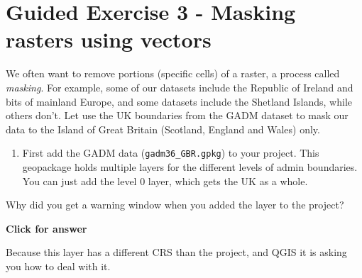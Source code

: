 \documentclass[
  letterpaper,
  DIV=11,
  numbers=noendperiod]{scrreprt}
\providecommand{\tightlist}{%
  \setlength{\itemsep}{0pt}\setlength{\parskip}{0pt}}\usepackage{longtable,booktabs,array}
\begin{document}
\section{Guided Exercise 3 - Masking rasters using
vectors}\label{guided-exercise-3---masking-rasters-using-vectors}

We often want to remove portions (specific cells) of a raster, a process
called \emph{masking}. For example, some of our datasets include the
Republic of Ireland and bits of mainland Europe, and some datasets
include the Shetland Islands, while others don't. Let use the UK
boundaries from the GADM dataset to mask our data to the Island of Great
Britain (Scotland, England and Wales) only.

\begin{enumerate}
\def\labelenumi{(\arabic{enumi})}
\setcounter{enumi}{128}
\tightlist
\item
  First add the GADM data (\texttt{gadm36\_GBR.gpkg}) to your project.
  This geopackage holds multiple layers for the different levels of
  admin boundaries. You can just add the level 0 layer, which gets the
  UK as a whole.
\end{enumerate}

\begin{tcolorbox}[enhanced jigsaw, breakable, toptitle=1mm, colback=white, left=2mm, leftrule=.75mm, titlerule=0mm, colframe=quarto-callout-important-color-frame, opacityback=0, title=\textcolor{quarto-callout-important-color}{\faExclamation}\hspace{0.5em}{Stop and Think}, toprule=.15mm, opacitybacktitle=0.6, bottomtitle=1mm, colbacktitle=quarto-callout-important-color!10!white, bottomrule=.15mm, coltitle=black, rightrule=.15mm, arc=.35mm]

Why did you get a warning window when you added the layer to the
project?

\end{tcolorbox}

\begin{tcolorbox}[enhanced jigsaw, leftrule=.75mm, colframe=quarto-callout-important-color-frame, breakable, toprule=.15mm, bottomrule=.15mm, arc=.35mm, rightrule=.15mm, opacityback=0, colback=white, left=2mm]

\vspace{-3mm}\textbf{Click for answer}\vspace{3mm}

Because this layer has a different CRS than the project, and QGIS it is
asking you how to deal with it.

\end{tcolorbox}
\end{document}
